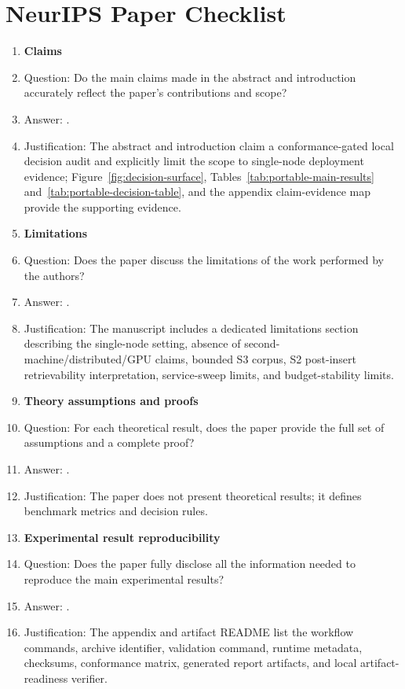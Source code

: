 \section*{NeurIPS Paper Checklist}

\begin{enumerate}

\item {\bf Claims}
    \item[] Question: Do the main claims made in the abstract and introduction accurately reflect the paper's contributions and scope?
    \item[] Answer: \answerYes{}.
    \item[] Justification: The abstract and introduction claim a conformance-gated local decision audit and explicitly limit the scope to single-node deployment evidence; Figure~\ref{fig:decision-surface}, Tables~\ref{tab:portable-main-results} and~\ref{tab:portable-decision-table}, and the appendix claim-evidence map provide the supporting evidence.

\item {\bf Limitations}
    \item[] Question: Does the paper discuss the limitations of the work performed by the authors?
    \item[] Answer: \answerYes{}.
    \item[] Justification: The manuscript includes a dedicated limitations section describing the single-node setting, absence of second-machine/distributed/GPU claims, bounded S3 corpus, S2 post-insert retrievability interpretation, service-sweep limits, and budget-stability limits.

\item {\bf Theory assumptions and proofs}
    \item[] Question: For each theoretical result, does the paper provide the full set of assumptions and a complete proof?
    \item[] Answer: \answerNA{}.
    \item[] Justification: The paper does not present theoretical results; it defines benchmark metrics and decision rules.

\item {\bf Experimental result reproducibility}
    \item[] Question: Does the paper fully disclose all the information needed to reproduce the main experimental results?
    \item[] Answer: \answerYes{}.
    \item[] Justification: The appendix and artifact README list the workflow commands, archive identifier, validation command, runtime metadata, checksums, conformance matrix, generated report artifacts, and local artifact-readiness verifier.


\end{enumerate}
